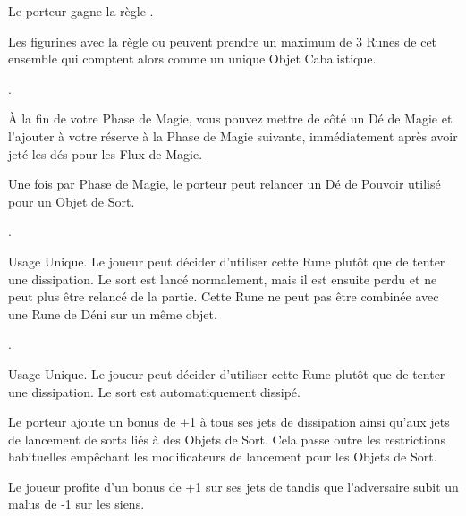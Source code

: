 \begin{multicols}{2}
Le porteur gagne la règle \fireborn{}.

\endpricelist

\subtitle{Runes Cabalistiques}\vspace{5pt}

Les figurines avec la règle \runecraft{} ou \runecraftmastery{} peuvent prendre un maximum de 3 Runes de cet ensemble qui comptent alors comme un unique Objet Cabalistique.

\begin{description}[leftmargin=0.3cm, labelindent=0cm, labelsep=0.1cm] %

\oneofakind{}.

À la fin de votre Phase de Magie, vous pouvez mettre de côté un Dé de Magie et l'ajouter à votre réserve à la Phase de Magie suivante, immédiatement après avoir jeté les dés pour les Flux de Magie.

Une fois par Phase de Magie, le porteur peut relancer un Dé de Pouvoir utilisé pour un Objet de Sort.

\oneperarmy{}.

Usage Unique. Le joueur peut décider d'utiliser cette Rune plutôt que de tenter une dissipation. Le sort est lancé normalement, mais il est ensuite perdu et ne peut plus être relancé de la partie. Cette Rune ne peut pas être combinée avec une Rune de Déni sur un même objet.

\oneperarmy{}.

Usage Unique. Le joueur peut décider d'utiliser cette Rune plutôt que de tenter une dissipation. Le sort est automatiquement dissipé.

 Le porteur ajoute un bonus de +1 à tous ses jets de dissipation ainsi qu'aux jets de lancement de sorts liés à des Objets de Sort. Cela passe outre les restrictions habituelles empêchant les modificateurs de lancement pour les Objets de Sort.

 Le joueur profite d'un bonus de +1 sur ses jets de \channel{} tandis que l'adversaire subit un malus de -1 sur les siens.

\end{description}

\subtitle{Bannières Runiques}\vspace{5pt}


\end{multicols}
